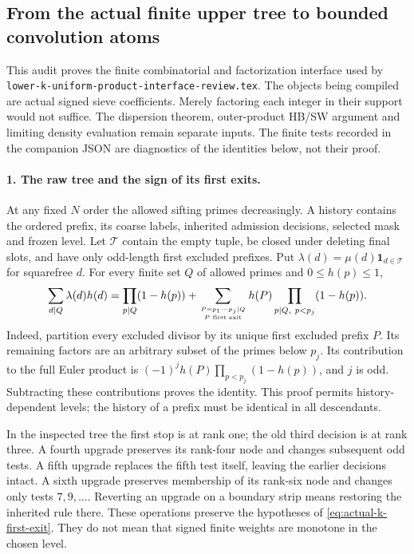 \subsection{From the actual finite upper tree to bounded convolution atoms}
\label{sec:actual-k-compilation-joint-audit}

This audit proves the finite combinatorial and factorization interface
used by \texttt{lower-k-uniform-product-interface-review.tex}. The
objects being compiled are actual signed sieve coefficients. Merely
factoring each integer in their support would not suffice. The
dispersion theorem, outer-product HB/SW argument and limiting density
evaluation remain separate inputs. The finite tests recorded in the
companion JSON are diagnostics of the identities below, not their proof.

\paragraph{1. The raw tree and the sign of its first exits.}
At any fixed $N$ order the allowed sifting primes decreasingly. A
history contains the ordered prefix, its coarse labels, inherited
admission decisions, selected mask and frozen level. Let $\mathcal T$
contain the empty tuple, be closed under deleting final slots, and have
only odd-length first excluded prefixes. Put
$\lambda(d)=\mu(d)\mathbf1_{d\in\mathcal T}$ for squarefree $d$.
For every finite set $Q$ of allowed primes and $0\le h(p)\le1$,
\begin{equation}\label{eq:actual-k-first-exit}
 \sum_{d\mid Q}\lambda(d)h(d)
 =\prod_{p\mid Q}(1-h(p))+
 \sum_{P=p_1\cdots p_j\mid Q\atop P\text{ first exit}}
 h(P)\prod_{p\mid Q,\ p<p_j}(1-h(p)).
\end{equation}
Indeed, partition every excluded divisor by its unique first excluded
prefix $P$. Its remaining factors are an arbitrary subset of the
primes below $p_j$. Its contribution to the full Euler product is
$(-1)^jh(P)\prod_{p<p_j}(1-h(p))$, and $j$ is odd. Subtracting these
contributions proves the identity. This proof permits history-dependent
levels; the history of a prefix must be identical in all descendants.

In the inspected tree the first stop is at rank one; the old third
decision is at rank three. A fourth upgrade preserves its rank-four
node and changes subsequent odd tests. A fifth upgrade replaces the
fifth test itself, leaving the earlier decisions intact. A sixth
upgrade preserves membership of its rank-six node and changes only
tests $7,9,\ldots$. Reverting an upgrade on a boundary strip means
restoring the inherited rule there. These operations preserve the
hypotheses of \eqref{eq:actual-k-first-exit}. They do not mean that
signed finite weights are monotone in the chosen level.

